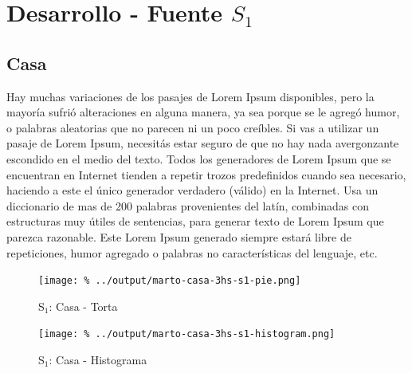 \documentclass[final,narroweqnarray,inline]{ieee}
\begin{document}
\clearpage
\section{Desarrollo - Fuente $S_1$}
  \subsection{Casa}

Hay muchas variaciones de los pasajes de Lorem Ipsum disponibles, pero la mayoría sufrió alteraciones en alguna manera, ya sea porque se le agregó humor, o palabras aleatorias que no parecen ni un poco creíbles. Si vas a utilizar un pasaje de Lorem Ipsum, necesitás estar seguro de que no hay nada avergonzante escondido en el medio del texto. Todos los generadores de Lorem Ipsum que se encuentran en Internet tienden a repetir trozos predefinidos cuando sea necesario, haciendo a este el único generador verdadero (válido) en la Internet. Usa un diccionario de mas de 200 palabras provenientes del latín, combinadas con estructuras muy útiles de sentencias, para generar texto de Lorem Ipsum que parezca razonable. Este Lorem Ipsum generado siempre estará libre de repeticiones, humor agregado o palabras no características del lenguaje, etc.

    \begin{figure}[ht]\begin{center}
      \texttt{[image: \%
      ../output/marto-casa-3hs-s1-pie.png]}
      \vspace{-2em}
      \caption{S$_1$: Casa - Torta}
      \label{marto-casa-3hs-s1-pie}
    \end{center}\end{figure}

    \begin{figure}[ht]\begin{center}
      \texttt{[image: \%
      ../output/marto-casa-3hs-s1-histogram.png]}
      \vspace{-2em}
      \caption{S$_1$: Casa - Histograma}
      \label{marto-casa-3hs-s1-histogram}
    \end{center}\end{figure}	
\end{document}
